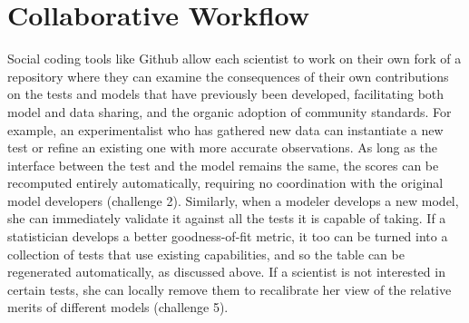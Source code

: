 \documentclass[9pt]{sig-alternate}
\begin{document}
%    
%
%
\section{Collaborative Workflow}\label{scidash}

Social coding tools like Github allow each scientist to work on their own fork of a repository where they can examine the consequences of their own contributions on  the tests and models that have previously been developed, facilitating both model and data sharing, and the organic adoption of community standards. For example, an experimentalist who has gathered new data can instantiate a new test or refine an existing one  with more accurate observations. As long as the interface between the test and the model remains the same, the scores can be recomputed entirely automatically, requiring no coordination with the original model developers (challenge 2). Similarly, when a modeler develops a new model, she can immediately  validate it against all the tests it is capable of taking. If a statistician develops a better goodness-of-fit metric, it too can be turned into a collection of tests that use existing capabilities, and so the table can be regenerated automatically, as discussed above. If a scientist is not interested in certain tests, she can locally remove them to recalibrate her view of the relative merits of different models (challenge 5). 
\end{document}
